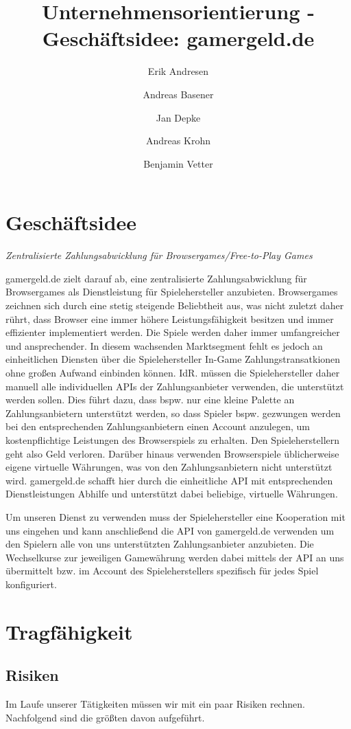 \documentclass[a4paper,10pt]{article}
\title{Unternehmensorientierung - Geschäftsidee: gamergeld.de}
\author{Erik Andresen \and Andreas Basener \and Jan Depke \and Andreas Krohn \and Benjamin Vetter}
\begin{document}
\maketitle

\section{Geschäftsidee}
\emph{Zentralisierte Zahlungsabwicklung für Browsergames/Free-to-Play Games}

gamergeld.de zielt darauf ab, eine zentralisierte Zahlungsabwicklung für
Browsergames als Dienstleistung für Spielehersteller anzubieten.  Browsergames
zeichnen sich durch eine stetig steigende Beliebtheit aus, was nicht zuletzt
daher rührt, dass Browser eine immer höhere Leistungsfähigkeit besitzen und
immer effizienter implementiert werden. Die Spiele werden daher immer
umfangreicher und ansprechender. In diesem wachsenden Marktsegment fehlt es
jedoch an einheitlichen Diensten über die Spielehersteller In-Game
Zahlungstransatkionen ohne großen Aufwand einbinden können. IdR. müssen die
Spielehersteller daher manuell alle individuellen APIs der Zahlungsanbieter
verwenden, die unterstützt werden sollen. Dies führt dazu, dass bspw. nur eine
kleine Palette an Zahlungsanbietern unterstützt werden, so dass Spieler bspw.
gezwungen werden bei den entsprechenden Zahlungsanbietern einen Account
anzulegen, um kostenpflichtige Leistungen des Browserspiels zu erhalten. Den
Spieleherstellern geht also Geld verloren.  Darüber hinaus verwenden
Browserspiele üblicherweise eigene virtuelle Währungen, was von den
Zahlungsanbietern nicht unterstützt wird.  gamergeld.de schafft hier durch die
einheitliche API mit entsprechenden Dienstleistungen Abhilfe und unterstützt
dabei beliebige, virtuelle Währungen.

Um unseren Dienst zu verwenden muss der Spielehersteller eine Kooperation mit
uns eingehen und kann anschließend die API von gamergeld.de verwenden um den
Spielern alle von uns unterstützten Zahlungsanbieter anzubieten. Die
Wechselkurse zur jeweiligen Gamewährung werden dabei mittels der API an uns
übermittelt bzw. im Account des Spieleherstellers spezifisch für jedes Spiel
konfiguriert.

\section{Tragfähigkeit}\label{labelTragfaehigkeit}

\subsection{Risiken}
Im Laufe unserer Tätigkeiten müssen wir mit ein paar Risiken rechnen. Nachfolgend sind die größten davon aufgeführt.
\end{document}

